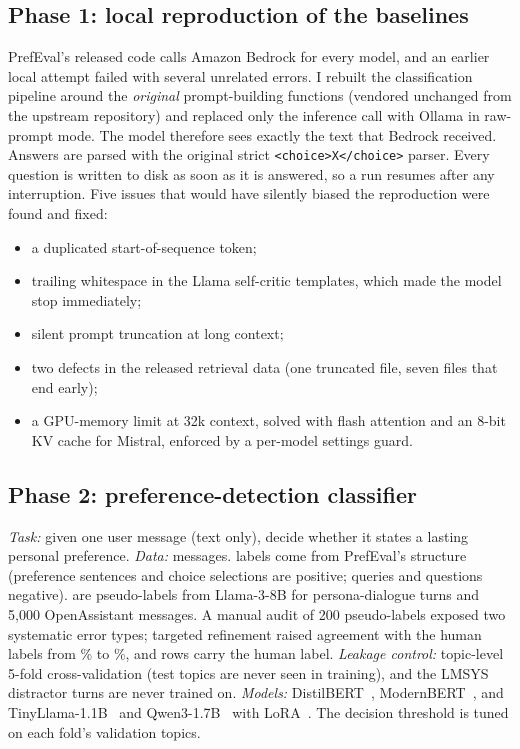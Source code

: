 \documentclass[lettersize,journal]{IEEEtran}
\begin{document}
\subsection{Phase 1: local reproduction of the baselines}
PrefEval's released code calls Amazon Bedrock for every model, and an earlier local attempt failed with several unrelated errors. I rebuilt
the classification pipeline around the \emph{original} prompt-building functions (vendored unchanged from the upstream repository) and replaced
only the inference call with Ollama in raw-prompt mode. The model therefore sees exactly the text that Bedrock received. Answers are
parsed with the original strict \texttt{<choice>X</choice>} parser. Every question is written to disk as soon as it is answered, so a run
resumes after any interruption. Five issues that would have silently biased the reproduction were found and fixed:
\begin{itemize}
  \item a duplicated start-of-sequence token;
  \item trailing whitespace in the Llama self-critic templates, which made the model stop immediately;
  \item silent prompt truncation at long context;
  \item two defects in the released retrieval data (one truncated file, seven files that end early);
  \item a GPU-memory limit at 32k context, solved with flash attention and an 8-bit KV cache for Mistral, enforced by a per-model settings guard.
\end{itemize}

\subsection{Phase 2: preference-detection classifier}
\emph{Task:} given one user message (text only), decide whether it states a lasting personal preference.
\emph{Data:} \pRows{} messages. \pGold{} labels come from PrefEval's structure (preference sentences and choice selections are positive;
queries and questions negative). \pPseudo{} are pseudo-labels from Llama-3-8B for persona-dialogue turns and 5{,}000 OpenAssistant
messages. A manual audit of 200 pseudo-labels exposed two systematic error types; targeted refinement raised agreement with the human labels from
\pAuditBefore\% to \pAuditAfter\%, and \pAudited{} rows carry the human label.
\emph{Leakage control:} topic-level 5-fold cross-validation (test topics are never seen in training), and the LMSYS distractor turns are never
trained on. \emph{Models:} DistilBERT~\cite{distilbert}, ModernBERT~\cite{modernbert}, and TinyLlama-1.1B~\cite{tinyllama} and
Qwen3-1.7B~\cite{qwen3} with LoRA~\cite{lora}. The decision threshold is tuned on each fold's validation topics.
\end{document}
